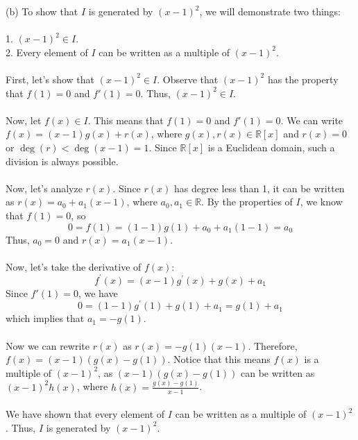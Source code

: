 \documentclass{article}
\begin{document}
\noindent(b) To show that $I$ is generated by $(x-1)^2$, we will demonstrate two things:\\\\
1. $(x-1)^2 \in I$.\\
2. Every element of $I$ can be written as a multiple of $(x-1)^2$.\\\\
First, let's show that $(x-1)^2 \in I$. Observe that $(x-1)^2$ has the property that $f(1)=0$ and $f'(1)=0$. Thus, $(x-1)^2 \in I$.\\\\
Now, let $f(x) \in I$. This means that $f(1) = 0$ and $f'(1) = 0$. We can write $f(x) = (x-1)g(x) + r(x)$, where $g(x), r(x) \in \mathbb{R}[x]$ and $r(x) = 0$ or $\deg(r) < \deg(x-1) = 1$. Since $\mathbb{R}[x]$ is a Euclidean domain, such a division is always possible.\\\\
Now, let's analyze $r(x)$. Since $r(x)$ has degree less than 1, it can be written as $r(x) = a_0 + a_1(x-1)$, where $a_0, a_1 \in \mathbb{R}$. By the properties of $I$, we know that $f(1) = 0$, so
$$
0=f(1)=(1-1) g(1)+a_0+a_1(1-1)=a_0
$$
Thus, $a_0 = 0$ and $r(x) = a_1(x-1)$.\\\\
Now, let's take the derivative of $f(x)$:
$$
f^{\prime}(x)=(x-1) g^{\prime}(x)+g(x)+a_1
$$
Since $f'(1) = 0$, we have
$$
0=(1-1) g^{\prime}(1)+g(1)+a_1=g(1)+a_1
$$
which implies that $a_1 = -g(1)$.\\\\
Now we can rewrite $r(x)$ as $r(x) = -g(1)(x-1)$. Therefore, $f(x) = (x-1)(g(x) - g(1))$. Notice that this means $f(x)$ is a multiple of $(x-1)^2$, as $(x-1)(g(x) - g(1))$ can be written as $(x-1)^2 h(x)$, where $h(x) = \frac{g(x) - g(1)}{x-1}$.\\\\
We have shown that every element of $I$ can be written as a multiple of $(x-1)^2$. Thus, $I$ is generated by $(x-1)^2$.\\\\
\end{document}
